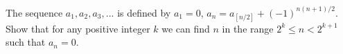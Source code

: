 The sequence $a_1, a_2, a_3, ...$ is defined by $a_1 = 0$, $a_n = a_{[n/2]} + (-1)^{n(n+1)/2}$. Show that for any positive integer $k$ we can find $n$ in the range $2^k \leq n < 2^{k+1}$ such that $a_n = 0$.